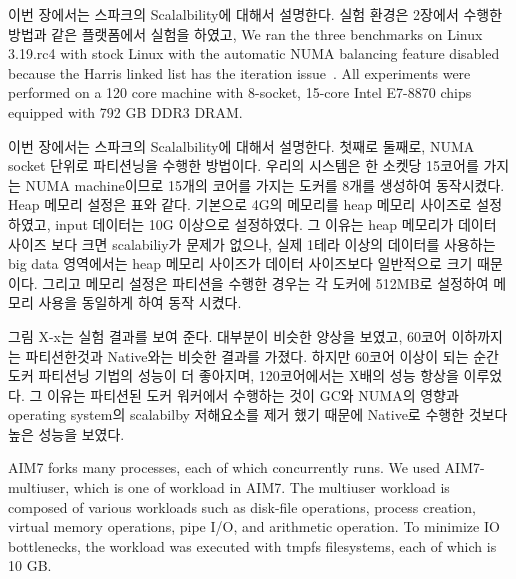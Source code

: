 \ifkor
이번 장에서는 스파크의 Scalalbility에 대해서 설명한다. 실험 환경은 2장에서 수행한 방법과
같은 플랫폼에서 실험을 하였고, 
We ran the three benchmarks on Linux 3.19.rc4 with stock Linux with 
the automatic NUMA balancing feature disabled because the
Harris linked list has the iteration issue~\cite{petrank2013lock}. 
All experiments were performed on a 120 core machine with 8-socket, 15-core
Intel E7-8870 chips equipped with 792 GB DDR3 DRAM.
\else

\fi




\ifkor
이번 장에서는 스파크의 Scalalbility에 대해서 설명한다. 첫째로 
둘째로, NUMA socket 단위로 파티션닝을 수행한 방법이다. 우리의 시스템은 한 소켓당 15코어를
가지는 NUMA machine이므로 15개의 코어를 가지는 도커를 8개를 생성하여 동작시켰다.
Heap 메모리 설정은 표와 같다. 기본으로 4G의 메모리를 heap 메모리 사이즈로 설정하였고,
input 데이터는 10G 이상으로 설정하였다. 그 이유는 heap 메모리가 데이터 사이즈 보다 크면
scalabiliy가 문제가 없으나, 실제 1테라 이상의 데이터를 사용하는 big data
영역에서는 heap 메모리 사이즈가 데이터 사이즈보다 일반적으로 크기 때문이다.
그리고 메모리 설정은 파티션을 수행한 경우는 각 도커에 512MB로 설정하여 메모리 사용을 
동일하게 하여 동작 시켰다. 
\else

\fi


\ifkor
그림 X-x는 실험 결과를 보여 준다. 대부분이 비슷한 양상을 보였고, 60코어 이하까지는
파티션한것과 Native와는 비슷한 결과를 가졌다. 하지만 60코어 이상이 되는 순간
도커 파티션닝 기법의 성능이 더 좋아지며, 120코어에서는 X배의 성능 항상을 이루었다.
그 이유는 파티션된 도커 워커에서 수행하는 것이 GC와 
NUMA의 영향과 operating system의 scalabilby 저해요소를 제거 했기 때문에 
Native로 수행한 것보다 높은 성능을 보였다. 
\else 

\fi


\ifkor
AIM7 forks many processes, each of which concurrently runs. 
We used AIM7-multiuser, which is one of workload in AIM7.
The multiuser workload is composed of various workloads such as disk-file
operations, process creation, virtual memory operations, pipe I/O, and
arithmetic operation.
To minimize IO bottlenecks, the workload was executed with tmpfs filesystems, each
of which is 10 GB.
\else

